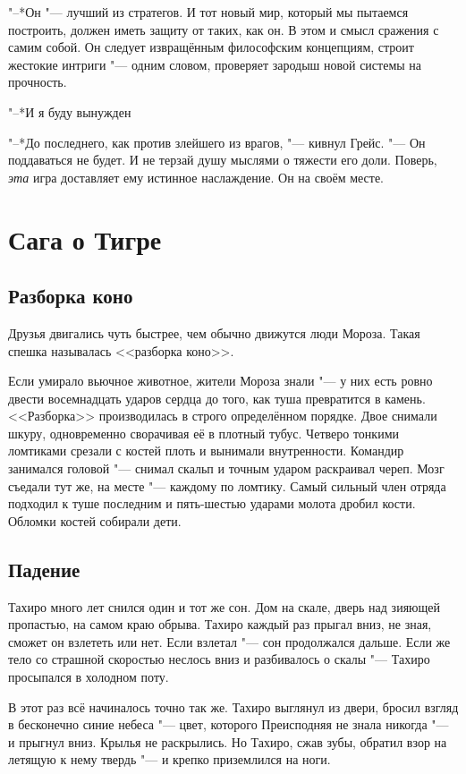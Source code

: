 "--*Он "--- лучший из стратегов.
И тот новый мир, который мы пытаемся построить, должен иметь защиту от таких, как он.
В этом и смысл сражения с самим собой.
Он следует извращённым философским концепциям, строит жестокие интриги "--- одним словом, проверяет зародыш новой системы на прочность.

"--*И я буду вынужден\ldotst

"--*До последнего, как против злейшего из врагов, "--- кивнул Грейс.
"--- Он поддаваться не будет.
И не терзай душу мыслями о тяжести его доли.
Поверь, \emph{эта} игра доставляет ему истинное наслаждение.
Он на своём месте.

\chapter{Сага о Тигре}

\section{Разборка коно}

Друзья двигались чуть быстрее, чем обычно движутся люди Мороза.
Такая спешка называлась <<разборка коно>>.

Если умирало вьючное животное, жители Мороза знали "--- у них есть ровно двести восемнадцать ударов сердца до того, как туша превратится в камень.
<<Разборка>> производилась в строго определённом порядке.
Двое снимали шкуру, одновременно сворачивая её в плотный тубус.
Четверо тонкими ломтиками срезали с костей плоть и вынимали внутренности.
Командир занимался головой "--- снимал скальп и точным ударом раскраивал череп.
Мозг съедали тут же, на месте "--- каждому по ломтику.
Самый сильный член отряда подходил к туше последним и пять-шестью ударами молота дробил кости.
Обломки костей собирали дети.

\section{Падение}

Тахиро много лет снился один и тот же сон.
Дом на скале, дверь над зияющей пропастью, на самом краю обрыва.
Тахиро каждый раз прыгал вниз, не зная, сможет он взлететь или нет.
Если взлетал "--- сон продолжался дальше.
Если же тело со страшной скоростью неслось вниз и разбивалось о скалы "--- Тахиро просыпался в холодном поту.

В этот раз всё начиналось точно так же.
Тахиро выглянул из двери, бросил взгляд в бесконечно синие небеса "--- цвет, которого Преисподняя не знала никогда "--- и прыгнул вниз.
Крылья не раскрылись.
Но Тахиро, сжав зубы, обратил взор на летящую к нему твердь "--- и крепко приземлился на ноги.

